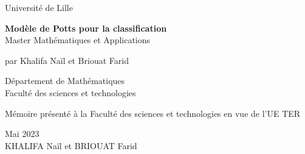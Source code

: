 \sloppy
\begin{titlepage}
  \begin{singlespace}
    \begin{center}
    {Université de Lille} \vspace{1.5 cm}\\
    \end{center}

    \begin{center}


      \Large{{\bf{Modèle de Potts pour la classification}}\\Master Mathématiques et Applications}


    \end{center}
    \vspace{1.5 cm}
    \begin{center}
      \normalsize{par Khalifa Naïl et Briouat Farid}
      \vspace{1.5 cm}
    \end{center}

    \begin{center}
      Département de Mathématiques\\
      Faculté des sciences et technologies
    \end{center}
    \vspace{1.5 cm}

    \begin{center}
      Mémoire présenté à la Faculté des sciences et technologies en vue de l'UE TER
    \end{center}
    \vspace{1.5 cm}






    \begin{center}
Mai 2023\\
\vspace{3 cm}
KHALIFA Naïl et BRIOUAT Farid
\end{center}
  \end{singlespace}

  \newpage
\end{titlepage} 